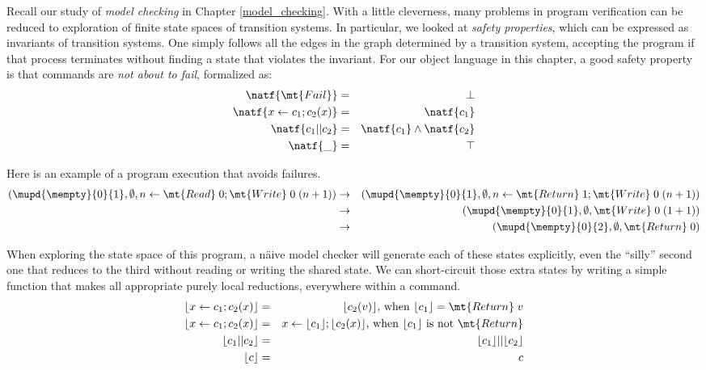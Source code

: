 \documentclass{amsbook}
\theoremstyle{definition}
\theoremstyle{remark}
\numberwithin{section}{chapter}
\numberwithin{equation}{chapter}
\begin{document}
Recall our study of \emph{model checking} in Chapter \ref{model_checking}.
With a little cleverness, many problems in program verification can be reduced to exploration of finite state spaces of transition systems.
In particular, we looked at \emph{safety properties}, which can be expressed as invariants of transition systems.
One simply follows all the edges in the graph determined by a transition system, accepting the program if that process terminates without finding a state that violates the invariant.
For our object language in this chapter, a good safety property is that commands are \emph{not about to fail}, formalized as:
\begin{eqnarray*}
  \natf{\mt{Fail}} &=& \bot \\
  \natf{x \leftarrow c_1; c_2(x)} &=& \natf{c_1} \\
  \natf{c_1 || c_2} &=& \natf{c_1} \land \natf{c_2} \\
  \natf{\_} &=& \top
\end{eqnarray*}

Here is an example of a program execution that avoids failures.
\begin{eqnarray*}
  (\mupd{\mempty}{0}{1}, \emptyset, n \leftarrow \mt{Read} \; 0; \mt{Write} \; 0 \; (n+1))
  &\rightarrow& (\mupd{\mempty}{0}{1}, \emptyset, n \leftarrow \mt{Return} \; 1; \mt{Write} \; 0 \; (n+1)) \\
  &\rightarrow& (\mupd{\mempty}{0}{1}, \emptyset, \mt{Write} \; 0 \; (1+1)) \\
  &\rightarrow& (\mupd{\mempty}{0}{2}, \emptyset, \mt{Return} \; 0)
\end{eqnarray*}

\newcommand{\rl}[1]{{\left \lfloor #1 \right \rfloor}}

When exploring the state space of this program, a n\"aive model checker will generate each of these states explicitly, even the ``silly'' second one that reduces to the third without reading or writing the shared state.
We can short-circuit those extra states by writing a simple function that makes all appropriate purely local reductions, everywhere within a command.
\begin{eqnarray*}
  \rl{x \leftarrow c_1; c_2(x)} &=& \rl{c_2(v)}\textrm{, when $\rl{c_1} = \mt{Return} \; v$} \\
  \rl{x \leftarrow c_1; c_2(x)} &=& x \leftarrow \rl{c_1}; \rl{c_2(x)}\textrm{, when $\rl{c_1}$ is not $\mt{Return}$} \\
  \rl{c_1 || c_2} &=& \rl{c_1} || \rl{c_2} \\
  \rl{c} &=& c
\end{eqnarray*}
\end{document}
